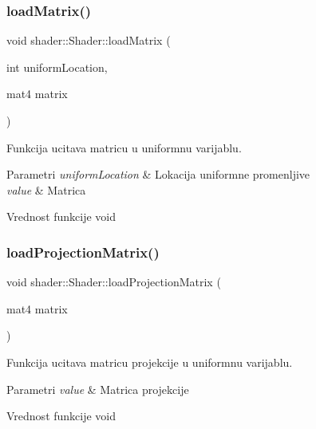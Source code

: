 \subsubsection{\texorpdfstring{load\+Matrix()}{loadMatrix()}}
{\footnotesize\ttfamily void shader\+::\+Shader\+::load\+Matrix (\begin{DoxyParamCaption}\item[{int}]{uniform\+Location,  }\item[{mat4}]{matrix }\end{DoxyParamCaption})}



Funkcija ucitava matricu u uniformnu varijablu. 


\begin{DoxyParams}{Parametri}
{\em uniform\+Location} & Lokacija uniformne promenljive \\
\hline
{\em value} & Matrica \\
\hline
\end{DoxyParams}
\begin{DoxyReturn}{Vrednost funkcije}
void 
\end{DoxyReturn}
\mbox{\label{classshader_1_1Shader_a574d7ff5ab4870990795f72014e1aa1e}} 
\subsubsection{\texorpdfstring{load\+Projection\+Matrix()}{loadProjectionMatrix()}}
{\footnotesize\ttfamily void shader\+::\+Shader\+::load\+Projection\+Matrix (\begin{DoxyParamCaption}\item[{mat4}]{matrix }\end{DoxyParamCaption})}



Funkcija ucitava matricu projekcije u uniformnu varijablu. 


\begin{DoxyParams}{Parametri}
{\em value} & Matrica projekcije \\
\hline
\end{DoxyParams}
\begin{DoxyReturn}{Vrednost funkcije}
void 
\end{DoxyReturn}
\mbox{\label{classshader_1_1Shader_aeabeeeb9e04b2704d6b22ff4a472afae}} 
